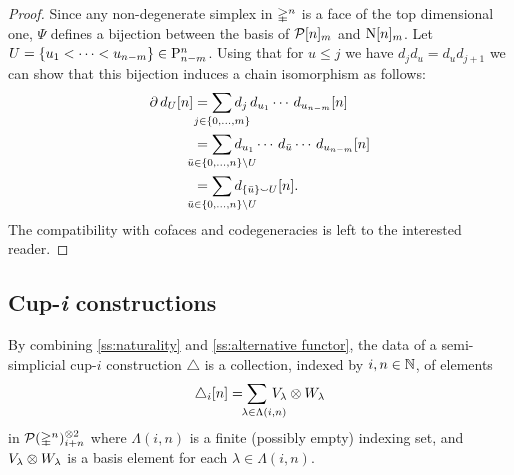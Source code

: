 \begin{proof}
	Since any non-degenerate simplex in $\mathbb{\Delta}^n$ is a face of the top dimensional one, $\Psi$ defines a bijection between the basis of $\mathcal{P}[n]_m$ and $\operatorname{N}[n]_m$.
	Let $U = \{u_1 < \cdots < u_{n-m}\} \in \mathrm{P}_{n-m}^n$.
	Using that for $u \leq j$ we have $d_jd_u = d_ud_{j+1}$ we can show that this bijection induces a chain isomorphism as follows:
	\begin{align*}
		\bd d_U[n] &=
		\sum_{\mathclap{j \in \{0, \dots, m\}}}
		d_j\, d_{u_1} \cdots\, d_{u_{n-m}}[n] \\ &=
		\sum_{\mathclap{\bar u \in \{0, \dots, n\} \setminus U}}
		d_{u_1} \cdots\, d_{\bar{u}} \cdots\, d_{u_{n-m}}[n] \\ &=
		\sum_{\mathclap{\bar u \in \{0, \dots, n\} \setminus U}}
		d_{\{\bar u\} \union U}[n].
	\end{align*}
	The compatibility with cofaces and codegeneracies is left to the interested reader.
\end{proof}


%

\subsection{Cup-\textit{i} constructions}

By combining \cref{ss:naturality} and \cref{ss:alternative functor}, the data of a semi-simplicial cup-$i$ construction $\triangle$ is a collection, indexed by $i,n \in \mathbb{N}$, of elements
\[
\triangle_i [n] =
\sum_{\mathclap{\quad \lambda \in \Lambda(i,n)}} \, V_\lambda \ot W_\lambda
\]
in $\mathcal{P}(\mathbb{\Delta}^n)^{\otimes 2}_{i+n}$
where $\Lambda(i,n)$ is a finite (possibly empty) indexing set, and $V_\lambda \otimes W_\lambda$ is a basis element for each $\lambda \in \Lambda(i,n)$.

